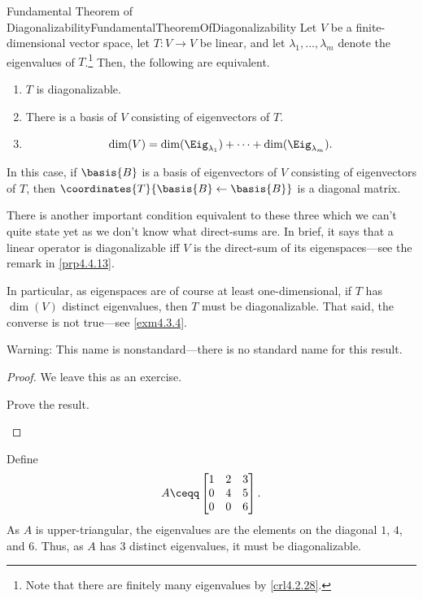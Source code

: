 \begin{thm}{Fundamental Theorem of Diagonalizability}{FundamentalTheoremOfDiagonalizability}
	Let $V$ be a finite-dimensional vector space, let $T\colon V\rightarrow V$ be linear, and let $\lambda _1,\ldots ,\lambda _m$ denote the eigenvalues of $T$.\footnote{Note that there are finitely many eigenvalues by \cref{crl4.2.28}.}  Then, the following are equivalent.
	\begin{enumerate}
		\item $T$ is diagonalizable.
		\item There is a basis of $V$ consisting of eigenvectors of $T$.
		\item
		\begin{equation}
			\dim (V)=\dim (\Eig _{\lambda _1})+\cdots +\dim (\Eig _{\lambda _m}).
		\end{equation}
	\end{enumerate}
	In this case, if $\basis{B}$ is a basis of eigenvectors of $V$ consisting of eigenvectors of $T$, then $\coordinates{T}{\basis{B}\leftarrow \basis{B}}$ is a diagonal matrix.
	\begin{rmk}
		There is another important condition equivalent to these three which we can't quite state yet as we don't know what direct-sums are.  In brief, it says that a linear operator is diagonalizable iff $V$ is the direct-sum of its eigenspaces---see the remark in \cref{prp4.4.13}.
	\end{rmk}
	\begin{rmk}
		In particular, as eigenspaces are of course at least one-dimensional, if $T$ has $\dim (V)$ distinct eigenvalues, then $T$ must be diagonalizable.  That said, the converse is not true---see \cref{exm4.3.4}.
	\end{rmk}
	\begin{rmk}
		Warning:  This name is nonstandard---there is no standard name for this result.
	\end{rmk}
	\begin{proof}
		We leave this as an exercise.
		\begin{exr}[breakable=false]{}{}
			Prove the result.
		\end{exr}
	\end{proof}
\end{thm}
\begin{exm}{}{}
	Define
	\begin{equation}
		A\ceqq \begin{bmatrix}1 & 2 & 3 \\ 0 & 4 & 5 \\ 0 & 0 & 6\end{bmatrix}.
	\end{equation}
	As $A$ is upper-triangular, the eigenvalues are the elements on the diagonal  $1$, $4$, and $6$.  Thus, as $A$ has $3$ distinct eigenvalues, it must be diagonalizable.
\end{exm}
